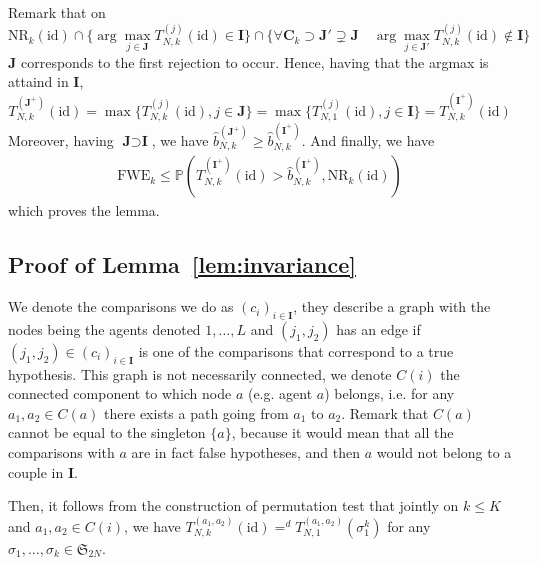 \documentclass{article}
\theoremstyle{plain}
\theoremstyle{remark}
\renewcommand{\P}{\mathbb{P}}
\renewcommand{\S}{\mathfrak{S}}
\newcommand{\1}{\mathbbm{1}}
\newcommand{\id}{\mathrm{id}}
\numberwithin{equation}{section}
\begin{document}
Remark that on $$\mathrm{NR}_k(\id) \cap \{\arg\max_{j \in \textbf{J}}T_{N,k}^{(j)}(\id) \in \textbf{I}\}\cap\{ \forall \textbf{C}_k \supset \textbf{J}'\supsetneq\textbf{J} \quad  \arg\max_{j \in \textbf{J}'}T_{N,k}^{(j)}(\id) \notin \textbf{I}\}  $$
$\textbf{J}$ corresponds to the first rejection to occur. Hence, having that the argmax is attaind in $\textbf{I}$,
$$T_{N,k}^{(\textbf{J}^+)}(\id)= \max\{T_{N,k}^{(j)}(\id), j \in \textbf{J}\} = \max\{T_{N,1}^{(j)}(\id), j \in \textbf{I}\} = T_{N,k}^{(\textbf{I}^+)}(\id)$$
Moreover, having $\textbf{J} \supset \textbf{I}$, we have $\widehat{b}_{N,k}^{(\textbf{J}^+)} \ge \widehat{b}_{N,k}^{(\textbf{I}^+)}$. And finally, we have 
\begin{align*}
\mathrm{FWE}_k\le \P\left( T_{N,k}^{(\textbf{I}^+)}(\id) > \widehat{b}_{N,k}^{(\textbf{I}^+)}, \mathrm{NR}_k(\id)\right)
\end{align*}
which proves the lemma.
\subsection{Proof of Lemma~\ref{lem:invariance}}
We denote the comparisons we do as $(c_i)_{i \in \textbf{I}}$, they describe a graph with the nodes being the agents denoted $1,\dots,L$ and $(j_1,j_2)$ has an edge if $(j_1,j_2)\in(c_i)_{i \in \textbf{I}}$ is one of the comparisons that correspond to a true hypothesis. This graph is not necessarily connected, we denote $C(i)$ the connected component to which node $a$ (e.g. agent $a$) belongs, i.e. for any $a_1,a_2 \in C(a)$ there exists a path going from $a_1$ to $a_2$. Remark that $C(a)$ cannot be equal to the singleton $\{a\}$, because it would mean that all the comparisons with $a$ are in fact false hypotheses, and then $a$ would not belong to a couple in $\textbf{I}$.

Then, it follows from the construction of permutation test that jointly on $k\le K$ and $a_1,a_2 \in C(i)$, we have $T_{N,k}^{(a_1,a_2)}(\id)=^d T_{N,1}^{(a_1,a_2)}(\sigma_1^k)$ for any $\sigma_1,\dots,\sigma_k \in  \S_{2N}$.
\end{document}
